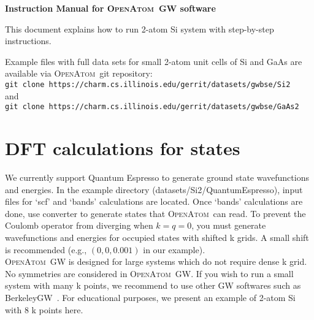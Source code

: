 \documentclass[12pt,draft]{article}
\newcommand{\openatom}{\textsc{OpenAtom}}
\newcommand{\note}[1]{{\bf \large \color{red} #1}}
\begin{document}
\begin{center}
{\bf \Large Instruction Manual for \openatom~GW software}
\end{center}

\vspace{0.5in}




\noindent This document explains how to run 2-atom Si system with step-by-step instructions.

\noindent Example files with full data sets for small 2-atom unit cells of Si and GaAs are available via \openatom\ git repository: 
\\
\verb+git clone https://charm.cs.illinois.edu/gerrit/datasets/gwbse/Si2+\\
and\\
\verb+git clone https://charm.cs.illinois.edu/gerrit/datasets/gwbse/GaAs2+


\section{DFT calculations for states}
We currently support Quantum Espresso to generate ground state wavefunctions and energies.
In the example directory (datasets/Si2/QuantumEspresso), input files for `scf' and `bands' calculations are located. 
Once `bands' calculations are done, use converter to generate states that \openatom\ can read.
To prevent the Coulomb operator from diverging when $k=q=0$, you must generate wavefunctions and energies for occupied states with shifted k grids. A small shift is recommended (e.g., $(0,0,0.001)$ in our example). \\

\noindent\openatom~GW is designed for large systems which do not require dense k grid. No symmetries are considered in \openatom~GW. If you wish to run a small system with many k points, we recommend to use other GW softwares such as BerkeleyGW~\cite{BGW}. %
For educational purposes, we present an example of 2-atom Si with 8 k points here. \\
\end{document}
